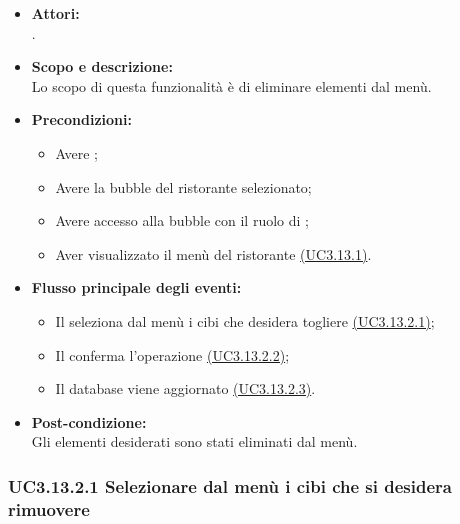 \begin{itemize}
	\item \textbf{Attori:}
	\\.
	\item \textbf{Scopo e descrizione:} 
	\\Lo scopo di questa funzionalità è di eliminare elementi dal menù.
	\item \textbf{Precondizioni:}
	\begin{itemize}
		\item Avere ;
		\item Avere la bubble del ristorante selezionato;
		\item Avere accesso alla bubble con il ruolo di ;
		\item Aver visualizzato il menù del ristorante \hyperref[UC3.13.1]{(UC3.13.1)}.
	\end{itemize}
	\item \textbf{Flusso principale degli eventi:}
	\begin{itemize}
		\item Il  seleziona dal menù i cibi che desidera togliere \hyperref[UC3.13.2.1]{(UC3.13.2.1)};
		\item Il  conferma l’operazione \hyperref[UC3.13.2.2]{(UC3.13.2.2)};
		\item Il database viene aggiornato \hyperref[UC3.13.2.3]{(UC3.13.2.3)}.
	\end{itemize}
	\item \textbf{Post-condizione:}
	\\Gli elementi desiderati sono stati eliminati dal menù.
\end{itemize}

\subsubsection{UC3.13.2.1 Selezionare dal menù i cibi che si desidera rimuovere} \label{UC3.13.2.1}

